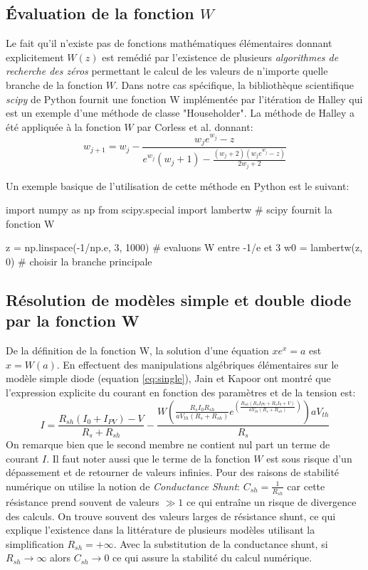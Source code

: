 \subsection{Évaluation de la fonction $W$}

Le fait qu'il n'existe pas de fonctions mathématiques élémentaires donnant explicitement $W(z)$ est remédié par l'existence de plusieurs \textit{algorithmes de recherche des zéros} permettant le calcul de les valeurs de n'importe quelle branche de la fonction $W$. Dans notre cas spécifique, la bibliothèque scientifique \textit{scipy} de Python fournit une fonction W implémentée par l'itération de Halley qui est un exemple d'une méthode de classe "Householder". La méthode de Halley a été appliquée à la fonction $W$  par Corless et al. \cite{Corless1996} donnant:
\begin{equation}
  \label{eq:halley}
  w_{j+1} = w_j - \frac{w_j e^{w_j} - z}{e^{w_j}(w_j + 1) - \frac{(w_j + 2)(w_j e^{w_j} - z)}{2w_j + 2}}
\end{equation}

Un exemple basique de l'utilisation de cette méthode en Python est le suivant:

\begin{python}[basicstyle=\tiny]
import numpy as np 
from scipy.special import lambertw # scipy fournit la fonction W

z = np.linspace(-1/np.e, 3, 1000) # evaluons W entre -1/e et 3
w0 = lambertw(z, 0) # choisir la branche principale
\end{python}

\subsection{Résolution de modèles simple et double diode par la fonction W}
De la définition de la fonction W, la solution d'une équation $xe^x = a$ est $x = W(a)$. En effectuent des manipulations algébriques élémentaires sur le modèle simple diode (equation \ref{eq:single}), Jain et Kapoor ont montré que l'expression explicite du courant en fonction des paramètres et de la tension est:
\begin{equation}
  \label{eq:lambertwsingle}
  I = \frac{R_{sh}(I_0 + I_{PV}) - V}{R_s + R_{sh}} - \frac{W\left(\frac{R_s I_0 R_{sh}}{a V_{th}(R_s + R_{sh})}e^{\left(\frac{R_{sh}(R_s I_{PV} + R_s I_0 + V)}{a V_{th} (R_s + R_{sh})}\right)}\right)aV_{th}}{R_s}
\end{equation}
On remarque bien que le second membre ne contient nul part un terme de courant $I$. Il faut noter aussi que le terme de la fonction $W$ est sous risque d'un dépassement et de retourner de valeurs infinies. Pour des raisons de stabilité numérique on utilise la notion de \textit{Conductance Shunt}: $C_{sh} = \frac{1}{R_{sh}}$ car cette résistance prend souvent de valeurs $\gg 1$ ce qui entraîne un risque de divergence des calculs. On trouve souvent des valeurs larges de résistance shunt, ce qui explique l'existence dans la littérature de plusieurs modèles utilisant la simplification $R_{sh} = + \infty$. Avec la substitution de la conductance shunt, si $R_{sh}\rightarrow\infty$ alors $C_{sh} \rightarrow 0$ ce qui assure la stabilité du calcul numérique.

